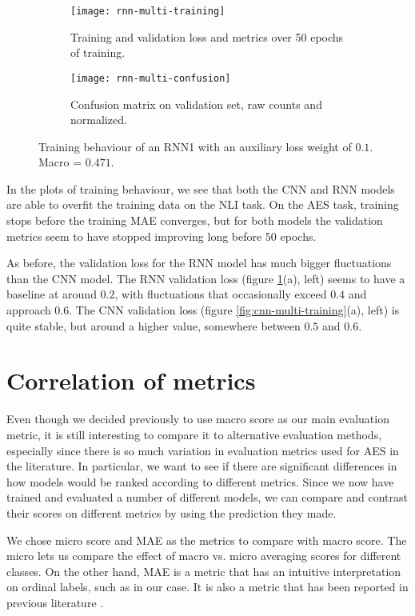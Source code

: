 \begin{figure}
  \begin{subfigure}{\linewidth}
    \centering
    \texttt{[image: rnn-multi-training]}
    \caption{Training and validation loss and metrics over 50 epochs of training.}
  \end{subfigure}
  \begin{subfigure}{\linewidth}
    \centering
    \texttt{[image: rnn-multi-confusion]}
    \caption{Confusion matrix on validation set, raw counts and normalized.}
  \end{subfigure}
  \caption[Training behaviour of a multi-task RNN]{
    Training behaviour of an RNN1 with an auxiliary loss weight of $0.1$.
    Macro \FI = $0.471$.
  }
  \label{fig:rnn-multi-training}
\end{figure}

In the plots of training behaviour, we see that both the CNN and RNN models are
able to overfit the training data on the \ac{NLI} task. On the \ac{AES} task,
training stops before the training MAE converges, but for both models the
validation metrics seem to have stopped improving long before 50 epochs.

As before, the validation loss for the RNN model has much bigger fluctuations
than the CNN model. The RNN validation loss (figure
\ref{fig:rnn-multi-training}(a), left) seems to have a baseline at around
$0.2$, with fluctuations that occasionally exceed $0.4$ and approach $0.6$.
The CNN validation loss (figure \ref{fig:cnn-multi-training}(a), left) is
quite stable, but around a higher value, somewhere between $0.5$ and $0.6$.


\section{Correlation of metrics}

Even though we decided previously to use macro \FI score as our main
evaluation metric, it is still interesting to compare it to alternative
evaluation methods, especially since there is so much variation in evaluation
metrics used for \ac{AES} in the literature. In particular, we want to see if
there are significant differences in how models would be ranked according to
different metrics. Since we now have trained and evaluated a number of
different models, we can compare and contrast their scores on different
metrics by using the prediction they made.

We chose micro \FI score and \ac{MAE} as the metrics to compare with macro
\FI score. The micro \FI lets us compare the effect of macro vs. micro
averaging scores for different classes. On the other hand, \ac{MAE} is a
metric that has an intuitive interpretation on ordinal labels, such as in our
case. It is also a metric that has been reported in previous literature
\autocite{vajjala17}.

